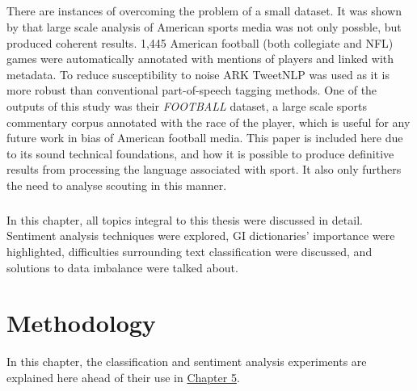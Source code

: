 \documentclass[oneside,12pt]{Classes/RoboticsLaTeX}
\begin{document}
\paragraph{}
There are instances of overcoming the problem of a small dataset. It was shown by \citep{CommentatorBias} that large scale analysis of American sports media was not only possble, 
but produced coherent results. 1,445 American football (both collegiate and NFL) games were automatically annotated with mentions of players and linked with metadata. To reduce
susceptibility to noise ARK TweetNLP was used as it is more robust than conventional part-of-speech tagging methods. One of the outputs of this study was their {\it FOOTBALL} dataset,
a large scale sports commentary corpus annotated with the race of the player, which is useful for any future work in bias of American football media. This paper is included here due to its
sound technical foundations, and how it is possible to produce definitive results from processing the language associated with sport. It also only furthers the need to analyse
scouting in this manner. \paragraph{}

In this chapter, all topics integral to this thesis were discussed in detail. Sentiment analysis techniques were explored, GI dictionaries' importance were highlighted, difficulties surrounding
text classification were discussed, and solutions to data imbalance were talked about.

\chapter{Methodology}
\label{chap:methodology}
In this chapter, the classification and sentiment analysis experiments are explained here ahead of their use in \hyperref[chap:experiments]{Chapter 5}.
\end{document}
